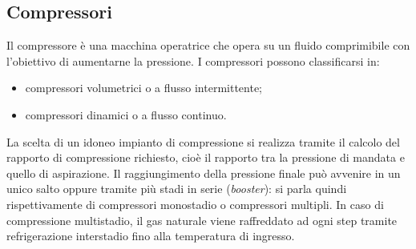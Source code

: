 \subsection{Compressori}
Il compressore è una macchina operatrice che opera su un fluido comprimibile con l'obiettivo di aumentarne la pressione. I compressori possono classificarsi in:
\begin{itemize}
    \item compressori volumetrici o a flusso intermittente;
    \item compressori dinamici o a flusso continuo.
\end{itemize}
 La scelta di un idoneo impianto di compressione si realizza tramite il calcolo del rapporto di compressione richiesto, cioè il rapporto tra la pressione di mandata e quello di aspirazione. Il raggiungimento della pressione finale può avvenire in un unico salto oppure tramite più stadi in serie (\textit{booster}): si parla quindi rispettivamente di compressori monostadio o compressori multipli. In caso di compressione multistadio, il gas naturale viene raffreddato ad ogni step tramite refrigerazione interstadio fino alla temperatura di ingresso.
